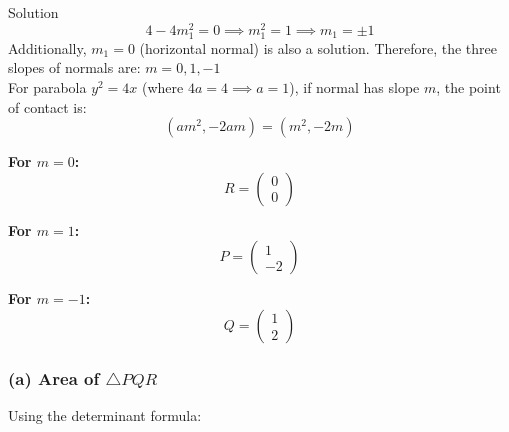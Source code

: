 \documentclass{beamer}
\newcommand{\myvec}[1]{\ensuremath{\begin{pmatrix}#1\end{pmatrix}}}
\begin{document}
\begin{frame}{Solution}
\begin{equation}
	4 - 4m_1^2 = 0 \implies m_1^2 = 1 \implies m_1 = \pm 1
\end{equation}
Additionally, $m_1 = 0$ (horizontal normal) is also a solution.
Therefore, the three slopes of normals are: $m = 0, 1, -1$\\
For parabola $y^2 = 4x$ (where $4a = 4 \implies a = 1$), if normal has slope $m$, the point of contact is:
\begin{equation}
	\left(am^2, -2am\right) = \left(m^2, -2m\right)
\end{equation}

\textbf{For $m = 0$:} 
\begin{equation}
	R = \myvec{0\\0}
\end{equation}

\textbf{For $m = 1$:} 
\begin{equation}
	P = \myvec{1\\-2}
\end{equation}

\textbf{For $m = -1$:} 
\begin{equation}
	Q = \myvec{1\\2}
\end{equation}
\subsubsection*{(a) Area of $\triangle PQR$}
Using the determinant formula:
\end{frame}
\end{document}
